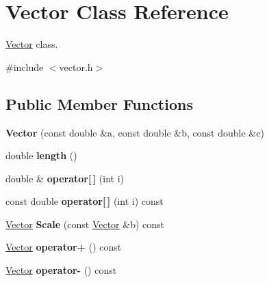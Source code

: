 \hypertarget{class_vector}{
\section{\-Vector \-Class \-Reference}
\label{class_vector}
}


\hyperlink{class_vector}{\-Vector} class.  




{\ttfamily \#include $<$vector.\-h$>$}

\subsection*{\-Public \-Member \-Functions}
\begin{DoxyCompactItemize}
\item 
\hypertarget{class_vector_ac37c37579f774e7caca05777438b35e1}{
{\bfseries \-Vector} (const double \&a, const double \&b, const double \&c)}
\label{class_vector_ac37c37579f774e7caca05777438b35e1}

\item 
\hypertarget{class_vector_a660c349db92ad8c2465487b78953f51c}{
double {\bfseries length} ()}
\label{class_vector_a660c349db92ad8c2465487b78953f51c}

\item 
\hypertarget{class_vector_a8cc4aefe1d880f18feac3426ea8d933e}{
double \& {\bfseries operator\mbox{[}$\,$\mbox{]}} (int i)}
\label{class_vector_a8cc4aefe1d880f18feac3426ea8d933e}

\item 
\hypertarget{class_vector_aaf99974616dc176c949a6eb14ab34685}{
const double {\bfseries operator\mbox{[}$\,$\mbox{]}} (int i) const }
\label{class_vector_aaf99974616dc176c949a6eb14ab34685}

\item 
\hypertarget{class_vector_a439f710d3deeb8609b3428d79630c420}{
\hyperlink{class_vector}{\-Vector} {\bfseries \-Scale} (const \hyperlink{class_vector}{\-Vector} \&b) const }
\label{class_vector_a439f710d3deeb8609b3428d79630c420}

\item 
\hypertarget{class_vector_a55aa4644709bc040a90dbff081bb717a}{
\hyperlink{class_vector}{\-Vector} {\bfseries operator+} () const }
\label{class_vector_a55aa4644709bc040a90dbff081bb717a}

\item 
\hypertarget{class_vector_a1c38f8a4f5f6f9438e3ec8233cfaa6b0}{
\hyperlink{class_vector}{\-Vector} {\bfseries operator-\/} () const }
\label{class_vector_a1c38f8a4f5f6f9438e3ec8233cfaa6b0}


\end{DoxyCompactItemize}
